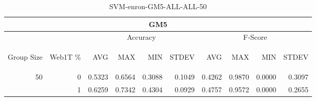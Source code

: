 \begin{center}
\begin{table}[htbp] 
 \begin{center}
\begin{tabular}{ | r | r | r | r | r | r | r | r | r | r |}
\hline
\multicolumn{10}{|c|}{GM5}\\
\hline
 & & \multicolumn{4}{|c|}{Accuracy} & \multicolumn{4}{|c|}{F-Score}\\ \cline{3-10}
\begin{sideways}Group Size\end{sideways} & \begin{sideways}Web1T \%\end{sideways} & \begin{sideways}AVG\end{sideways} & \begin{sideways}MAX\end{sideways} & \begin{sideways}MIN\end{sideways} & \begin{sideways}STDEV\end{sideways} & \begin{sideways}AVG\end{sideways} & \begin{sideways}MAX\end{sideways} & \begin{sideways}MIN\end{sideways} & \begin{sideways}STDEV\end{sideways}\\
\hline
\multirow{1}{*}{50}
 & 0 & 0.5323 & 0.6564 & 0.3088 & 0.1049 & 0.4262 & 0.9870 & 0.0000 & 0.3097\\ \cline{2-10}
 & 1 & 0.6259 & 0.7342 & 0.4304 & 0.0929 & 0.4757 & 0.9572 & 0.0000 & 0.2655\\ \cline{2-10}
\hline
\end{tabular}
\caption{SVM-enron-GM5-ALL-ALL-50}
\label{table:SVM-enron-GM5-ALL-ALL-50}
\end{center}
 \end{table}
\end{center}

